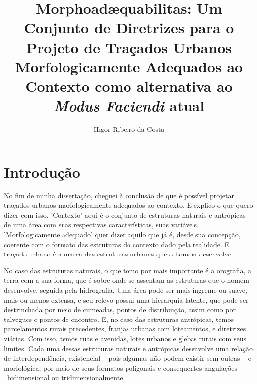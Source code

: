 \documentclass[]{report}
\title{\textbf{Morphoadæquabilitas}: Um Conjunto de Diretrizes para o Projeto de Traçados Urbanos Morfologicamente Adequados ao Contexto como alternativa ao \textit{Modus Faciendi} atual}
\author{Higor Ribeiro da Costa}
\begin{document}
\maketitle

\tableofcontents

\begin{abstract}
\end{abstract}

\chapter*{Introdução}
	\onehalfspacing

	No fim de minha dissertação, cheguei à conclusão de que é possível projetar traçados urbanos morfologicamente adequados ao contexto. E explico o que quero dizer com isso. 'Contexto' aqui é o conjunto de estruturas naturais e antrópicas de uma área com suas respectivas características, suas variáveis. 'Morfologicamente adequado' quer dizer aquilo que já é, desde sua concepção, coerente com o formato das estruturas do contexto dado pela realidade. E traçado urbano é a marca das estruturas urbanas que o homem desenvolve.
	
	No caso das estruturas naturais, o que tomo por mais importante é a orografia, a terra com a sua forma, que é sobre onde se assentam as estruturas que o homem desenvolve, seguida pela hidrografia. Uma área pode ser mais íngreme ou suave, mais ou menos extensa, e seu relevo possui uma hierarquia latente, que pode ser destrinchada por meio de cumeadas, pontos de distribuição, assim como por talvegues e pontos de encontro. E, no caso das estruturas antrópicas, temos parcelamentos rurais precedentes, franjas urbanas com loteamentos, e diretrizes viárias. Com isso, temos ruas e avenidas, lotes urbanos e glebas rurais com seus limites. Cada uma dessas estruturas naturais e antrópicas desenvolve uma relação de interdependência, existencial – pois algumas não podem existir sem outras – e morfológica, por meio de seus formatos poligonais e consequentes angulações – bidimensional ou tridimensionalmente. 
	
\end{document}
